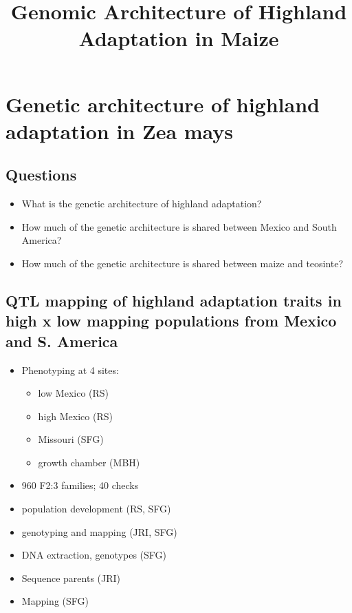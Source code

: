 \documentclass[]{article}
\begin{document}
\title{Genomic Architecture of Highland Adaptation in Maize}


\section{Genetic architecture of highland adaptation in Zea mays}

\subsection{Questions}
\begin{itemize}
\item What is the genetic architecture of highland adaptation?
\item How much of the genetic architecture is shared between Mexico and South America?
\item  How much of the genetic architecture is shared between maize and teosinte?
\end{itemize}

\subsection{QTL mapping of highland adaptation traits in high x low mapping populations from Mexico and S. America}
\begin{itemize}
\item Phenotyping at 4 sites: 
\begin{itemize}
\item low Mexico (RS)
\item high Mexico (RS) 
\item Missouri (SFG)
\item growth chamber (MBH)
\end{itemize}
\item 960 F2:3 families; 40 checks
\item population development (RS, SFG)
\item genotyping and mapping (JRI, SFG)
\item DNA extraction, genotypes (SFG)
\item Sequence parents (JRI)
\item Mapping (SFG)
\end{itemize}
\end{document}
